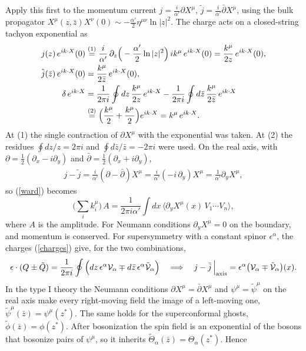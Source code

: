 \begin{tcolorbox}[breakable]
\begin{remark}
Apply this first to the momentum current $j = \frac{i}{\alpha'}\partial X^\mu$, $\tilde j = \frac{i}{\alpha'}\bar\partial X^\mu$, using the bulk propagator $X^\mu(z,\bar z)X^\nu(0)\sim -\frac{\alpha'}{2}\eta^{\mu\nu}\ln|z|^2$. The charge acts on a closed-string tachyon exponential as
\begin{align*}
j(z)\,e^{ik\cdot X}(0) &\overset{(1)}{=} \frac{i}{\alpha'}\,\partial_z\Big(-\frac{\alpha'}{2}\ln|z|^2\Big)\,ik^\mu\, e^{ik\cdot X}(0) = \frac{k^\mu}{2z}\,e^{ik\cdot X}(0), \\
\tilde j(\bar z)\,e^{ik\cdot X}(0) &= \frac{k^\mu}{2\bar z}\,e^{ik\cdot X}(0),\\
\delta\, e^{ik\cdot X} &= \frac{1}{2\pi i}\oint dz\,\frac{k^\mu}{2z}\,e^{ik\cdot X} - \frac{1}{2\pi i}\oint d\bar z\,\frac{k^\mu}{2\bar z}\,e^{ik\cdot X} \\
&\overset{(2)}{=} \Big(\frac{k^\mu}{2} + \frac{k^\mu}{2}\Big)e^{ik\cdot X} = k^\mu\,e^{ik\cdot X}.
\end{align*}
At (1) the single contraction of $\partial X^\mu$ with the exponential was taken. At (2) the residues $\oint dz/z = 2\pi i$ and $\oint d\bar z/\bar z = -2\pi i$ were used. On the real axis, with $\partial = \frac12(\partial_x - i\partial_y)$ and $\bar\partial = \frac12(\partial_x+i\partial_y)$,
\begin{align*}
j - \tilde j = \frac{i}{\alpha'}(\partial-\bar\partial)X^\mu = \frac{i}{\alpha'}(-i\,\partial_y)X^\mu = \frac{1}{\alpha'}\partial_yX^\mu ,
\end{align*}
so (\ref{ward}) becomes
\begin{equation}
\Big(\sum_i k_i^\mu\Big)\,A = \frac{1}{2\pi i\alpha'}\int dx\,\Big\langle \partial_y X^\mu(x)\,V_1\cdots V_n\Big\rangle ,
\tag{D.4}\label{momward}
\end{equation}
where $A$ is the amplitude. For Neumann conditions $\partial_yX^\mu = 0$ on the boundary, and momentum is conserved. For supersymmetry with a constant spinor $\epsilon^\alpha$, the charges (\ref{charges}) give, for the two combinations,
\begin{align*}
\epsilon\cdot(Q\pm\tilde Q) = \frac{1}{2\pi i}\oint\Big(dz\,\epsilon^\alpha\mathcal V_\alpha \mp d\bar z\,\epsilon^\alpha\tilde{\mathcal V}_\alpha\Big)
\quad\Longrightarrow\quad j - \tilde j\,\Big|_{\rm axis} = \epsilon^\alpha\big(\mathcal V_\alpha \mp \tilde{\mathcal V}_\alpha\big)(x).
\end{align*}
In the type I theory the Neumann conditions $\partial X^\mu = \bar\partial X^\mu$ and $\psi^\mu = \tilde\psi^\mu$ on the real axis make every right-moving field the image of a left-moving one, $\tilde\psi^\mu(\bar z) = \psi^\mu(z^*)$. The same holds for the superconformal ghosts, $\tilde\phi(\bar z) = \phi(z^*)$. After bosonization the spin field is an exponential of the bosons that bosonize pairs of $\psi^\mu$, so it inherits $\tilde\Theta_\alpha(\bar z) = \Theta_\alpha(z^*)$. Hence

\end{remark}
\end{tcolorbox}

